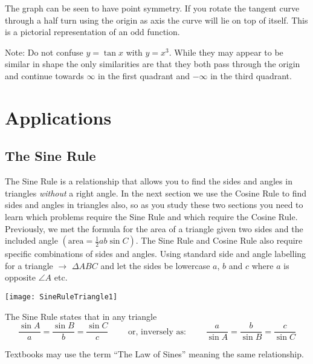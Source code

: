 The graph can be seen to have point symmetry. If you rotate the tangent curve through a half turn using the origin as axis the curve will lie on top of itself. This is a pictorial representation of an odd function.

Note: Do not confuse $y =\tan  x$ with $y =x^{3}$. While they may appear to be similar in shape the only similarities are that they both pass through the origin and continue towards $\infty $ in the first quadrant and $ -\infty $ in the third quadrant. 

\section{Applications}\label{sec:applications}
\subsection*{The Sine Rule}
The Sine Rule is a relationship that allows you to find the sides and angles in triangles \textit{without} a right angle. In the next section we use the Cosine Rule to find sides and angles in triangles also, so as you study these two sections you need to learn which problems require the Sine Rule and which require the Cosine Rule. Previously, we met the formula for the area of a triangle given two sides and the included angle $\left ( \text{area}=\frac{1}{2} a b \sin  C\right )$. The Sine Rule and Cosine Rule also require specific combinations of sides and angles. Using standard side and angle labelling for a triangle $\rightarrow$ $\Delta A B C$ and let the sides be lowercase $a$, $b$ and $c$ where $a$ is opposite $\angle A$ etc. 
\begin{center}
\texttt{[image: SineRuleTriangle1]}
\end{center}

\begin{tcolorbox}
	The Sine Rule states that in any triangle
	\begin{equation*}\frac{\sin  A}{a} =\frac{\sin  B}{b} =\frac{\sin  C}{c}\qquad%
	\text{ or, inversely as: }%
	\qquad\frac{a}{\sin  A} =\frac{b}{\sin  B} =\frac{c}{\sin  C}
	\end{equation*}\end{tcolorbox}
Textbooks may use the term ``The Law of Sines'' meaning the same relationship. 

